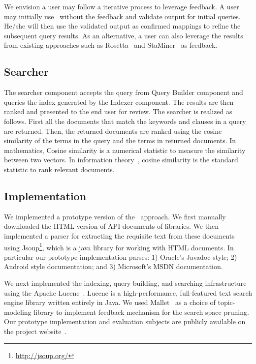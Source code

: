 We envision a user may follow a iterative process to leverage feedback.  
A user may initially use \tool\ without the feedback and validate output for initial queries.
He/she will then use the validated output as confirmed mappings to refine the subsequent query results.
As an alternative, a user can also leverage the results from existing approaches such as Rosetta~\cite{Gokhale2013ICSE} and StaMiner~\cite{nguyen2014statistical} as feedback.



\subsection{Searcher}
\label{sub:approach_searcher}

The searcher component accepts the query from Query Builder component and queries the index generated by the Indexer component.
The results are then ranked and presented to the end user for review.
The searcher is realized as follows. 
First all the documents that match the keywords and clauses in a query are returned.
Then, the returned documents are ranked using the cosine similarity\cite{singhal2001modern} of the terms in the query and the terms in returned documents. In mathematics, Cosine similarity is a numerical statistic to measure the similarity between two vectors. 
In information theory~\cite{manning2008introduction}, cosine similarity is the standard statistic to rank relevant documents.




    


\subsection{Implementation}
\label{sub:Approach_implementation}

We implemented a prototype version of the \tool\ approach.
We first manually downloaded the HTML version of API documents of libraries. 
We then implemented a parser for extracting the requisite text from these documents using 
Jsoup\footnote{\url{http://jsoup.org/}}, which is a java library for working with HTML documents.
In particular our prototype implementation parses: 
1) Oracle's Javadoc style;
2) Android style documentation; and
3) Microsoft's  MSDN documentation.

We next implemented the indexing, query building, and searching infrastructure using the Apache Lucene~\cite{lucene}.
Lucene is a high-performance, full-featured text search engine library written entirely in Java.
We used Mallet~\cite{McCallum}  as a choice of topic-modeling library to implement feedback mechanism for the search space pruning.
Our prototype implementation and evaluation subjects are publicly available on the project website~\cite{projectWeb}. 

